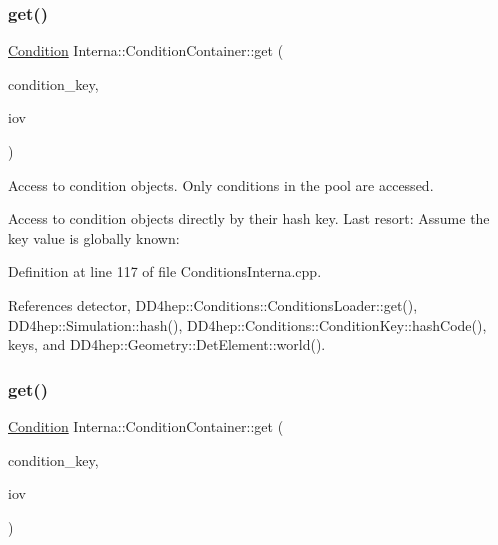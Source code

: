 \subsubsection{\texorpdfstring{get()}{get()}\hspace{0.1cm}{\footnotesize\ttfamily [3/4]}}
{\footnotesize\ttfamily \hyperlink{class_d_d4hep_1_1_conditions_1_1_condition}{Condition} Interna\+::\+Condition\+Container\+::get (\begin{DoxyParamCaption}\item[{const std\+::string \&}]{condition\+\_\+key,  }\item[{const \hyperlink{class_d_d4hep_1_1_conditions_1_1_user_pool}{User\+Pool} \&}]{iov }\end{DoxyParamCaption})}



Access to condition objects. Only conditions in the pool are accessed. 

Access to condition objects directly by their hash key. Last resort\+: Assume the key value is globally known\+: 

Definition at line 117 of file Conditions\+Interna.\+cpp.



References detector, D\+D4hep\+::\+Conditions\+::\+Conditions\+Loader\+::get(), D\+D4hep\+::\+Simulation\+::hash(), D\+D4hep\+::\+Conditions\+::\+Condition\+Key\+::hash\+Code(), keys, and D\+D4hep\+::\+Geometry\+::\+Det\+Element\+::world().

\hypertarget{class_d_d4hep_1_1_conditions_1_1_interna_1_1_condition_container_a90e9c820b464a25d242823b7a0786a6a}{}\label{class_d_d4hep_1_1_conditions_1_1_interna_1_1_condition_container_a90e9c820b464a25d242823b7a0786a6a} 
\subsubsection{\texorpdfstring{get()}{get()}\hspace{0.1cm}{\footnotesize\ttfamily [4/4]}}
{\footnotesize\ttfamily \hyperlink{class_d_d4hep_1_1_conditions_1_1_condition}{Condition} Interna\+::\+Condition\+Container\+::get (\begin{DoxyParamCaption}\item[{\hyperlink{class_d_d4hep_1_1_conditions_1_1_interna_1_1_condition_container_a7a4545b4b0536565feb7346bd97c63fa}{key\+\_\+type}}]{condition\+\_\+key,  }\item[{const \hyperlink{class_d_d4hep_1_1_conditions_1_1_user_pool}{User\+Pool} \&}]{iov }\end{DoxyParamCaption})}



